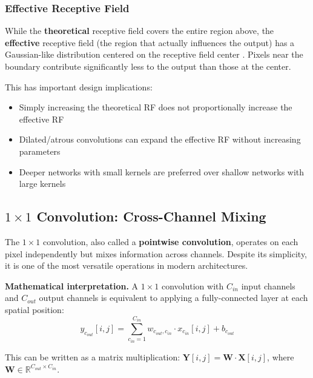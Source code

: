 \subsubsection{Effective Receptive Field}

While the \textbf{theoretical} receptive field covers the entire region above, the \textbf{effective} receptive field (the region that actually influences the output) has a Gaussian-like distribution centered on the receptive field center \cite{luo2016understanding}. Pixels near the boundary contribute significantly less to the output than those at the center.

This has important design implications:
\begin{itemize}
    \item Simply increasing the theoretical RF does not proportionally increase the effective RF
    \item Dilated/atrous convolutions can expand the effective RF without increasing parameters
    \item Deeper networks with small kernels are preferred over shallow networks with large kernels
\end{itemize}

\subsection{\texorpdfstring{$1 \times 1$}{1x1} Convolution: Cross-Channel Mixing}

The $1 \times 1$ convolution, also called a \textbf{pointwise convolution}, operates on each pixel independently but mixes information across channels. Despite its simplicity, it is one of the most versatile operations in modern architectures.

\textbf{Mathematical interpretation.} A $1 \times 1$ convolution with $C_{in}$ input channels and $C_{out}$ output channels is equivalent to applying a fully-connected layer at each spatial position:
\begin{equation}
y_{c_{out}}[i, j] = \sum_{c_{in}=1}^{C_{in}} w_{c_{out}, c_{in}} \cdot x_{c_{in}}[i, j] + b_{c_{out}}
\end{equation}

This can be written as a matrix multiplication: $\mathbf{Y}[i,j] = \mathbf{W} \cdot \mathbf{X}[i,j]$, where $\mathbf{W} \in \mathbb{R}^{C_{out} \times C_{in}}$.


